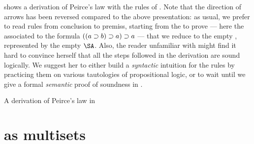 \begin{scope}
 shows a derivation of Peirce's law with the rules of
. Note that the direction of arrows has been reversed compared to the
above presentation: as usual, we prefer to read rules from conclusion to
premiss, starting from the  to prove --- here the  associated to the
formula $((a \supset b) \supset a) \supset a$ --- that we reduce to the empty ,
represented by the empty $\SA$. Also, the reader unfamiliar with  might find
it hard to convince herself that all the steps followed in the derivation are
sound logically. We suggest her to either build a \emph{syntactic} intuition for
the rules by practicing them on various tautologies of propositional logic, or
to wait until we give a formal \emph{semantic} proof of soundness in
.

\begin{marginfigure}
  
  \caption{A derivation of Peirce's law in }
\end{marginfigure}



\section{ as multisets}


\end{scope}
